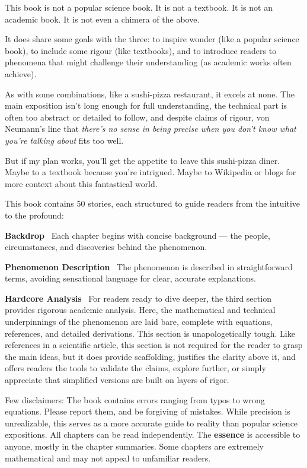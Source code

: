 

This book is not a popular science book. It is not a textbook. It is not an academic book. It is not even a chimera of the above.  

It does share some goals with the three: to inspire wonder (like a popular science book), to include some rigour (like textbooks), and to introduce readers to phenomena that might challenge their understanding (as academic works often achieve).

As with some combinations, like a sushi-pizza restaurant, it excels at none.  
The main exposition isn't long enough for full understanding, the technical part is often too abstract or detailed to follow, and despite claims of rigour, von Neumann's line that \textit{there's no sense in being precise when you don't know what you're talking about} fits too well.

But if my plan works, you'll get the appetite to leave this sushi-pizza diner. Maybe to a textbook because you're intrigued. Maybe to Wikipedia or blogs for more context about this fantastical world.

This book contains 50 stories, each structured to guide readers from the intuitive to the profound:

\textbf{Backdrop} \ Each chapter begins with concise background — the people, circumstances, and discoveries behind the phenomenon.

\textbf{Phenomenon Description} \ The phenomenon is described in straightforward terms, avoiding sensational language for clear, accurate explanations.

\textbf{Hardcore Analysis} \ For readers ready to dive deeper, the third section provides rigorous academic analysis. Here, the mathematical and technical underpinnings of the phenomenon are laid bare, complete with equations, references, and detailed derivations. This section is unapologetically tough. Like references in a scientific article, this section is not required for the reader to grasp the main ideas, but it does provide scaffolding, justifies the clarity above it, and offers readers the tools to validate the claims, explore further, or simply appreciate that simplified versions are built on layers of rigor.

Few disclaimers: The book contains errors ranging from typos to wrong equations. Please report them, and be forgiving of mistakes. While precision is unrealizable, this serves as a more accurate guide to reality than popular science expositions. All chapters can be read independently. The \textbf{essence} is accessible to anyone, mostly in the chapter summaries. Some chapters are extremely mathematical and may not appeal to unfamiliar readers. 

